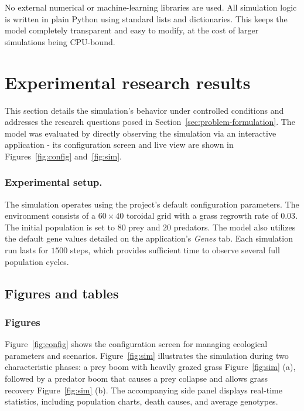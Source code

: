 \documentclass[english]{projectreport}
\begin{document}
No external numerical or machine-learning libraries are used. All simulation logic is written in plain Python using standard lists and dictionaries. This keeps the model completely transparent and easy to modify, at the cost of larger simulations being CPU-bound.



\section{Experimental research results}
\label{sec:results}

This section details the simulation's behavior under controlled conditions and addresses the research questions posed in Section~\ref{sec:problem-formulation}. The model was evaluated by directly observing the simulation via an interactive application - its configuration screen and live view are shown in Figures~\ref{fig:config} and~\ref{fig:sim}.

\subsubsection{Experimental setup.}
The simulation operates using the project's default configuration parameters. The environment consists of a $60 \times 40$ toroidal grid with a grass regrowth rate of $0.03$. The initial population is set to $80$ prey and $20$ predators. The model also utilizes the default gene values detailed on the application's \emph{Genes} tab. Each simulation run lasts for $1500$ steps, which provides sufficient time to observe several full population cycles.


\subsection{Figures and tables}
\label{sec:figs-tables}

\subsubsection{Figures}
\label{sec:figures}

Figure~\ref{fig:config} shows the configuration screen for managing ecological parameters and scenarios. Figure~\ref{fig:sim} illustrates the simulation during two characteristic phases: a prey boom with heavily grazed grass Figure~\ref{fig:sim} (a), followed by a predator boom that causes a prey collapse and allows grass recovery Figure~\ref{fig:sim} (b). The accompanying side panel displays real-time statistics, including population charts, death causes, and average genotypes.
\end{document}
